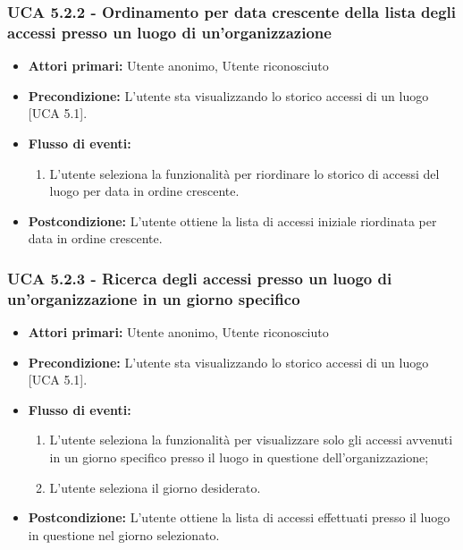\subsubsection{UCA 5.2.2 - Ordinamento per data crescente della lista degli accessi presso un luogo di un'organizzazione}
\begin{itemize}
    \item \textbf{Attori primari:} Utente anonimo, Utente riconosciuto
    \item \textbf{Precondizione:} L'utente sta visualizzando lo storico accessi di un luogo [UCA 5.1].
    \item \textbf{Flusso di eventi:}
    \begin{enumerate}
        \item L'utente seleziona la funzionalità per riordinare lo storico di accessi del luogo per data in ordine crescente.
    \end{enumerate}
    \item \textbf{Postcondizione:} L'utente ottiene la lista di accessi iniziale riordinata per data in ordine crescente.
\end{itemize}

\subsubsection{UCA 5.2.3 - Ricerca degli accessi presso un luogo di un'organizzazione in un giorno specifico}
\begin{itemize}
    \item \textbf{Attori primari:} Utente anonimo, Utente riconosciuto
    \item \textbf{Precondizione:} L'utente sta visualizzando lo storico accessi di un luogo [UCA 5.1].
    \item \textbf{Flusso di eventi:}
    \begin{enumerate}
        \item L'utente seleziona la funzionalità per visualizzare solo gli accessi avvenuti in un giorno specifico presso il luogo in questione dell'organizzazione;
        \item L'utente seleziona il giorno desiderato.
    \end{enumerate}
    \item \textbf{Postcondizione:} L'utente ottiene la lista di accessi effettuati presso il luogo in questione nel giorno selezionato.
\end{itemize}

